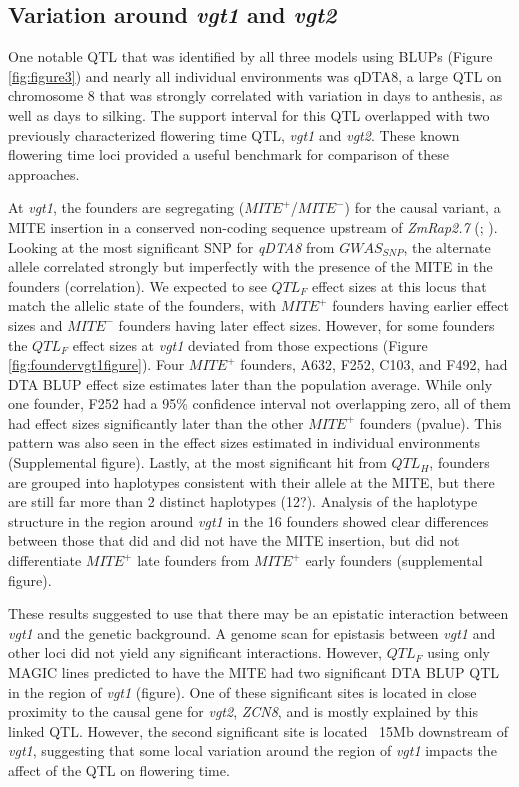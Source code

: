 \documentclass[article,9pt,twocolumn,twoside]{rilabRxiv}
\begin{document}
\subsection{Variation around \emph{vgt1} and \emph{vgt2}}
One notable QTL that was identified by all three models using BLUPs (Figure \ref{fig:figure3}) and nearly all individual environments was qDTA8, a large QTL on chromosome 8 that was strongly correlated with variation in days to anthesis, as well as days to silking.
The support interval for this QTL overlapped with two previously characterized flowering time QTL, \emph{vgt1} and \emph{vgt2}.
These known flowering time loci provided a useful benchmark for comparison of these approaches.

At \emph{vgt1}, the founders are segregating ($MITE^+$/$MITE^-$) for the causal variant, a MITE insertion in a conserved non-coding sequence upstream of \emph{ZmRap2.7} (\cite{Salvi}; \cite{Castelletti}).
Looking at the most significant SNP for \emph{qDTA8} from $GWAS_{SNP}$, the alternate allele correlated strongly but imperfectly with the presence of the MITE in the founders (correlation).
We expected to see $QTL_F$ effect sizes at this locus that match the allelic state of the founders, with $MITE^+$ founders having earlier effect sizes and $MITE^-$ founders having later effect sizes.
However, for some founders the $QTL_F$ effect sizes at \emph{vgt1} deviated from those expections (Figure \ref{fig:foundervgt1figure}).
Four $MITE^+$ founders, A632, F252, C103, and F492, had DTA BLUP effect size estimates later than the population average.
While only one founder, F252 had a 95\% confidence interval not overlapping zero, all of them had effect sizes significantly later than the other $MITE^+$ founders (pvalue).
This pattern was also seen in the effect sizes estimated in individual environments (Supplemental figure).
Lastly, at the most significant hit from $QTL_H$, founders are grouped into haplotypes consistent with their allele at the MITE, but there are still far more than 2 distinct haplotypes (12?).
Analysis of the haplotype structure in the region around \emph{vgt1} in the 16 founders showed clear differences between those that did and did not have the MITE insertion, but did not differentiate $MITE^+$ late founders from $MITE^+$ early founders (supplemental figure).

These results suggested to use that there may be an epistatic interaction between \emph{vgt1} and the genetic background.
A genome scan for epistasis between \emph{vgt1} and other loci did not yield any significant interactions.
However, $QTL_F$ using only MAGIC lines predicted to have the MITE had two significant DTA BLUP QTL in the region of \emph{vgt1} (figure).
One of these significant sites is located in close proximity to the causal gene for \emph{vgt2}, \emph{ZCN8}, and is mostly explained by this linked QTL.
However, the second significant site is located ~15Mb downstream of \emph{vgt1}, suggesting that some local variation around the region of \emph{vgt1} impacts the affect of the QTL on flowering time.
\end{document}

